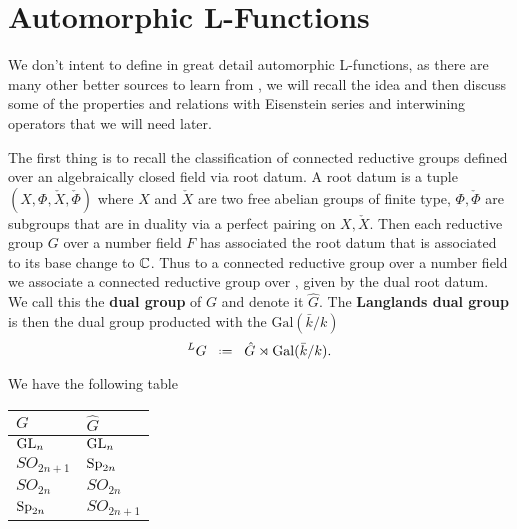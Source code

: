 

\section{Automorphic L-Functions}
We don't intent to define in great detail automorphic L-functions, as there are many other better sources to learn from \cite[Part 2.III.2]{borelAutomorphicFormsRepresentations1979}\cite{shahidiEisensteinSeriesAutomorphic2010}\cite{cogdellLFUNCTIONSFUNCTORIALITY}\cite[9, 10, 11]{bumpIntroductionLanglandsProgram2004}\cite{arthurLfunctionsAutomorphicRepresenta}, we will recall the idea and then discuss some of the properties and relations with Eisenstein series and interwining operators that we will need later.

The first thing is to recall the classification of connected reductive groups defined over an algebraically closed field via root datum. A root datum is a tuple \((X, \Phi, \check{X} , \check{\Phi})\) where \(X\) and \(\check{X}\) are two free abelian groups of finite type, \(\Phi, \check{\Phi}\) are subgroups that are in duality via a perfect pairing on \(X, \check{X}\). Then each reductive group \(G\) over a number field \(F\) has associated the root datum that is associated to its base change to \(\C\). Thus to a connected reductive group over a number field we associate a connected reductive group over \C, given by the dual root datum. We call this the \textbf{dual group} of \(G\) and denote it \(\hat{G}\). The \textbf{Langlands dual group} is then the dual group producted with the \(\mathrm{Gal}(\bar{k}/k)\)
\[^L G \defeq \hat{G} \rtimes \mathrm{Gal}(\bar{k}/k).\]

\begin{example}
	We have the following table
	\begin{table}[h]
		\centering
		\begin{tabular}{ll}
			\(G\)         & \(\hat{G}\)   \\ \hline
			\(\operatorname{GL}_n\)     & \(\operatorname{GL}_n\)     \\
			\(SO_{2n+1}\) & \(\operatorname{Sp}_{2n}\)  \\
			\(SO_{2n}\)   & \(SO_{2n}\)   \\
			\(\operatorname{Sp}_{2n}\)  & \(SO_{2n+1}\)
		\end{tabular}
	\end{table}
\end{example}


